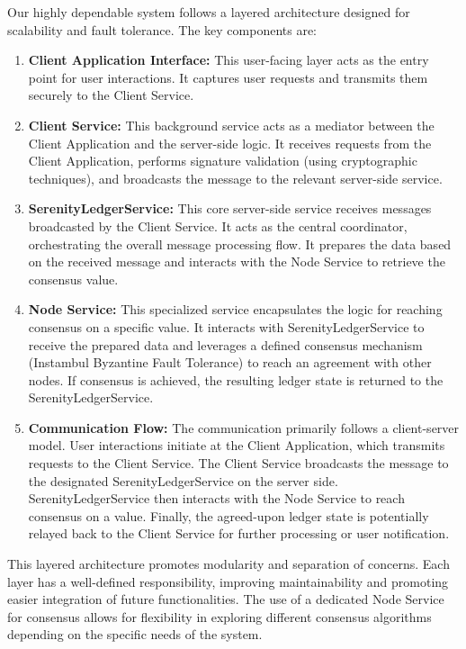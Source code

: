 Our highly dependable system follows a layered architecture designed for scalability and fault tolerance. The key components are:

\begin{enumerate}
    \item \textbf{Client Application Interface:} This user-facing layer acts as the entry point for user interactions. It captures user requests and transmits them securely to the Client Service. 

    \item \textbf{Client Service:} This background service acts as a mediator between the Client Application and the server-side logic. It receives requests from the Client Application, performs signature validation (using cryptographic techniques), and broadcasts the message to the relevant server-side service.  

    \item \textbf{SerenityLedgerService:} This core server-side service receives messages broadcasted by the Client Service. It acts as the central coordinator, orchestrating the overall message processing flow. It prepares the data based on the received message and interacts with the Node Service to retrieve the consensus value.

    \item \textbf{Node Service:} This specialized service encapsulates the logic for reaching consensus on a specific value. It interacts with SerenityLedgerService to receive the prepared data and leverages a defined consensus mechanism (Instambul Byzantine Fault Tolerance) to reach an agreement with other nodes. If consensus is achieved, the resulting ledger state is returned to the SerenityLedgerService.

    \item \textbf{Communication Flow:}  The communication primarily follows a client-server model. User interactions initiate at the Client Application, which transmits requests to the Client Service. The Client Service broadcasts the message to the designated SerenityLedgerService on the server side. SerenityLedgerService then interacts with the Node Service to reach consensus on a value. Finally, the agreed-upon ledger state is potentially relayed back to the Client Service for further processing or user notification.
\end{enumerate}

This layered architecture promotes modularity and separation of concerns. Each layer has a well-defined responsibility, improving maintainability and promoting easier integration of future functionalities. The use of a dedicated Node Service for consensus allows for flexibility in exploring different consensus algorithms depending on the specific needs of the system.

